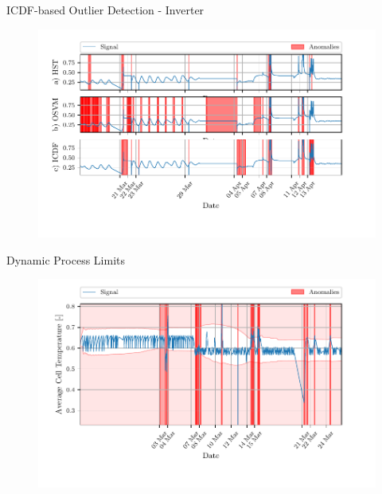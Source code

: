 \documentclass[aspectratio=169]{beamer}
\begin{document}
\begin{frame}{ICDF-based Outlier Detection - Inverter}
    \begin{figure}[htpb]
        \begin{center}
            \includegraphics[width=0.78\linewidth]{figures/Inverter_Temperature_sliding_compare_anomalies.pdf}
        \end{center}
    \end{figure}
\end{frame}

\begin{frame}{Dynamic Process Limits}
    \begin{figure}[htpb]
        \begin{center}
            \includegraphics[width=0.78\linewidth]{figures/Average_Cell_Temperature_sliding_thresh_.pdf}
        \end{center}
    \end{figure}
\end{frame}
\end{document}
